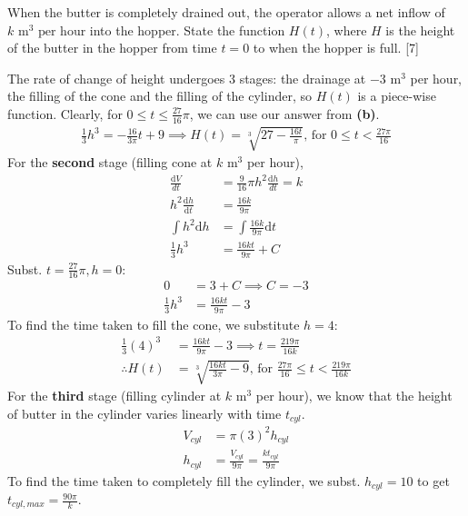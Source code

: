 \documentclass[12pt, a4 paper]{article}
\begin{document}
\begin{outline}[enumerate]
 \2 When the butter is completely drained out, the operator allows a net inflow of $k\textrm{ m}^3{\textrm{ per hour}}$ into the hopper. State the function $H(t)$, where $H$ is the height of the butter in the hopper from time $t=0$ to when the hopper is full. \hfill[7]
 \begin{answer}
   The rate of change of height undergoes 3 stages: the drainage at $-$3 m$^3$ per hour, the filling of the cone and the filling of the cylinder, so $H(t)$ is a piece-wise function. Clearly, for $0 \leq t \leq \frac{27}{16}\pi$, we can use our answer from \textbf{(b)}.
   \begin{align*}
     \frac{1}{3}h^3 = -\frac{16}{3\pi}t + 9 \implies H(t)=\sqrt[3]{27-\frac{16t}{\pi}} \textrm{, for }0 \leq t < \frac{27\pi}{16}
   \end{align*}
   For the \textbf{second} stage (filling cone at $k$ m$^3$ per hour),
   \begin{align*}
     \frac{\mathrm{d}V}{{d}t} &= \frac{9}{16}\pi h^2\frac{\mathrm{d}h}{{d}t} = k\\
     {h^2}\frac{{{\mathrm{d}}h}}{{{\mathrm{d}}t}} &= \frac{{16k}}{{9\pi }}\\
     \int {h^2}\mathrm{d}h &= \int \frac{16k}{9\pi} \mathrm{d}t\\
     \frac{1}{3}h^3 &= \frac{16kt}{9\pi}+C
   \end{align*}
   Subst. $t=\frac{27}{16}\pi,h=0$:
   \begin{align*}
     0 &= 3+C \implies C=-3\\
     \frac{1}{3}h^3 &= \frac{16kt}{9\pi}-3
   \end{align*}
   To find the time taken to fill the cone, we substitute $h=4$:
   \begin{align*}
     \frac{1}{3}(4)^3 &= \frac{16kt}{9\pi}-3 \implies t=\frac{219\pi}{16k}\\
     \therefore H(t)&=\sqrt[3]{\frac{16kt}{3\pi}-9} \textrm{, for }\frac{27\pi}{16} \leq t < \frac{219\pi}{16k}
   \end{align*}
   For the \textbf{third} stage (filling cylinder at $k$ m$^3$ per hour), we know that the height of butter in the cylinder varies linearly with time $t_{cyl}$.
   \begin{align*}
     V_{cyl}&=\pi(3)^2h_{cyl}\\
     h_{cyl}&= \frac{V_{cyl}}{9\pi} = \frac{kt_{cyl}}{9\pi}
   \end{align*}
   To find the time taken to completely fill the cylinder, we subst. $h_{cyl}=10$ to get $t_{cyl,max}=\frac{90\pi}{k}$.

\end{answer}
\end{outline}
\end{document}
